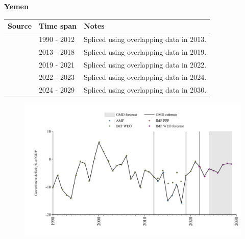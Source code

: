 \documentclass[12pt,a4paper,landscape]{article}
\begin{document}
\begin{adjustbox}{max totalsize={\paperwidth}{\paperheight},center}
\begin{minipage}[t][\textheight][t]{\textwidth}
\vspace*{0.5cm}
{}
\begin{center}
{\Large\bfseries Yemen}
\end{center}
\vspace{0.5cm}
\begin{table}[H]
\centering
\small
\begin{tabular}{|l|l|l|}
\hline
\textbf{Source} & \textbf{Time span} & \textbf{Notes} \\
\hline
\rowcolor{white}\cite{IMF_WEO}& 1990 - 2012 &Spliced using overlapping data in 2013.\\
\rowcolor{lightgray}\cite{AMF}& 2013 - 2018 &Spliced using overlapping data in 2019.\\
\rowcolor{white}\cite{IMF_WEO}& 2019 - 2021 &Spliced using overlapping data in 2022.\\
\rowcolor{lightgray}\cite{IMF_FPP}& 2022 - 2023 &Spliced using overlapping data in 2024.\\
\rowcolor{white}\cite{IMF_WEO_forecast}& 2024 - 2029 &Spliced using overlapping data in 2030.\\
\hline
\end{tabular}
\end{table}
\begin{figure}[H]
\centering
\includegraphics[width=\textwidth,height=0.6\textheight,keepaspectratio]{graphs/YEM_govdef_GDP.pdf}
\end{figure}
\end{minipage}
\end{adjustbox}
\end{document}
